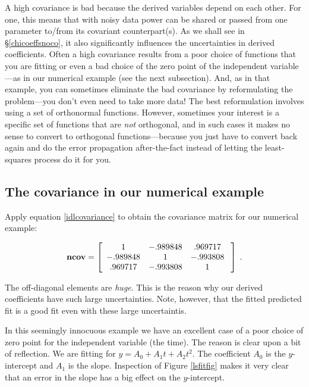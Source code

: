 \documentclass[psfig,preprint]{aastex}
\begin{document}
	A high covariance is bad because the derived variables depend on
each other.  For one, this means that with noisy data power can be
shared or passed from one parameter to/from its covariant
counterpart(s). As we shall see in \S \ref{chicoeffsnoco}, it also
significantly  influences the uncertainties in derived coefficients.
Often a high covariance results from a poor choice of functions that you
are fitting or even a bad choice of the zero point of the independent
variable---as in our numerical example (see the next subsection).  And,
as in that example, you can sometimes eliminate the bad covariance by
reformulating the problem---you don't even need to take more data! The
best reformulation involves using a set of orthonormal functions.
However, sometimes your interest is a specific set of functions that are
{\it not} orthogonal, and in such cases it makes no sense to convert to
orthogonal functions---because you just have to convert back again and
do the error propagation after-the-fact instead of letting the
least-squares process do it for you.

\subsection{ The covariance in our numerical example} \label{covarianceone}

	Apply equation \ref{idlcovariance} to obtain the covariance
matrix for our numerical example:

\begin{eqnarray}
{\bf ncov} = \left[
\begin{array}{ccc}
1  &  -.989848   &  .969717  \\
-.989848  &  1   &  -.993808  \\
.969717  & -.993808 &  1  \\
\end{array} \; \right] \; .
\end{eqnarray}

	The off-diagonal elements are {\it huge}.  This is the reason
why our derived coefficients have such large uncertainties.  Note,
however, that the fitted predicted fit is a good fit even with these
large uncertaintis. 

	In this seemingly innocuous example we have an excellent case of
a poor choice of zero point for the independent variable (the time). 
The reason is clear upon a bit of reflection. We are fitting for $y =
A_0 + A_1 t + A_2 t^2$. The coefficient $A_0$ is the $y$-intercept and
$A_1$ is the slope. Inspection of Figure \ref{lsfitfig} makes it very
clear that an error in the slope has a big effect on the $y$-intercept. 
\end{document}
